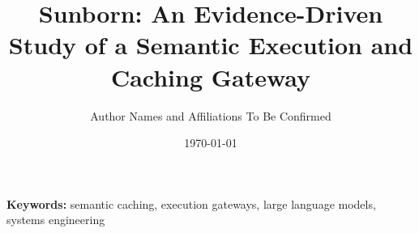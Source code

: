 \documentclass[11pt]{article}
\title{Sunborn: An Evidence-Driven Study of a Semantic Execution and Caching Gateway}
\author{Author Names and Affiliations To Be Confirmed}
\date{\today}
\begin{document}
\maketitle

\begin{abstract}
\end{abstract}

\noindent\textbf{Keywords:} semantic caching, execution gateways, large language models, systems engineering











\end{document}
